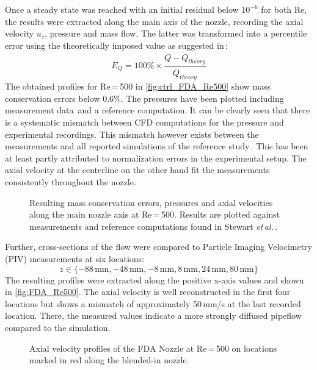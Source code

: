 Once a steady state was reached with an initial residual below $10^{-6}$ for both Re, the results were extracted along the main axis of the nozzle, recording the axial velocity $u_z$, pressure and mass flow. The latter was transformed into a percentile error using the theoretically imposed value as suggested in\,\cite{Stewart2012}:
\begin{equation*}
	E_Q = 100\% \times \frac{\dot{Q} - \dot{Q}_{theory}}{\dot{Q}_{theory}}
\end{equation*}
The obtained profiles for Re\,=\,500 in \autoref{fig:ctrl_FDA_Re500} show mass conservation errors below 0.6\%. The pressures have been plotted including measurement data\,\cite{Stewart2012} and a reference computation. It can be clearly seen that there is a systematic mismatch between CFD computations for the pressure and experimental recordings. This mismatch however exists between the measurements and all reported simulations of the reference study\,\cite{Stewart2012}. This has been at least partly attributed to normalization errors in the experimental setup. The axial velocity at the centerline on the other hand fit the measurements consistently throughout the nozzle.
\begin{figure}[htbp]
	\centering
	
	\vspace*{-1cm}
	\caption[Centerline results for the FDA Nozzle at Re\,=\,500]{Resulting mass conservation errors, pressures and axial velocities along the main nozzle axis at Re\,=\,500. Results are plotted against measurements and reference computations found in Stewart \textit{et\,al.}\,\cite{Stewart2012}.}\label{fig:ctrl_FDA_Re500}
\end{figure}
Further, cross-sections of the flow were compared to Particle Imaging Velocimetry (PIV) measurements at six locations:
\[
	z \in \{-88\,\text{mm}, -48\,\text{mm}, -8\,\text{mm}, 8\,\text{mm}, 24\,\text{mm}, 80\,\text{mm}\}
\]
The resulting profiles were extracted along the positive x-axis values and shown in \autoref{fig:FDA_Re500}. The axial velocity is well reconstructed in the first four locations but shows a mismatch of approximately 50\,mm/s at the last recorded location. There, the measured values indicate a more strongly diffused pipeflow compared to the simulation.
\begin{figure}[htb]
	\centering
	\vspace*{-0.3cm}
	
	\vspace*{-0.7cm}
	\caption[Axial velocity profiles of the FDA Nozzle at Re\,=\,500]{Axial velocity profiles of the FDA Nozzle at Re\,=\,500 on locations marked in red along the blended-in nozzle.}\label{fig:FDA_Re500}
\end{figure}
